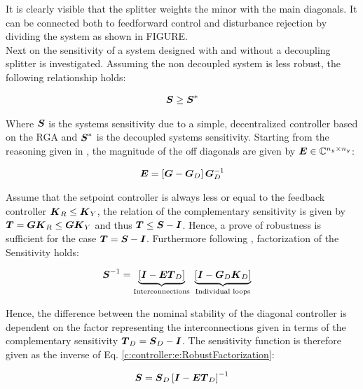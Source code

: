It is clearly visible that the splitter weights the minor with the main diagonals. It can be connected both to feedforward control and disturbance rejection by dividing the system as shown in FIGURE.\\

Next on the sensitivity of a system designed with and without a decoupling splitter is investigated. Assuming the non decoupled system is less robust, the following relationship holds:

\begin{align}
\mbox{\boldmath$S$} \geq \mbox{\boldmath$S$}^*
\end{align}

Where $\mbox{\boldmath$S$}$ is the systems sensitivity due to a simple, decentralized controller based on the RGA and $\mbox{\boldmath$S$}^*$ is the decoupled systems sensitivity. Starting from the reasoning given in \cite[p.443 ff.]{Skogestad2005}, the magnitude of the off diagonals are given by $\mbox{\boldmath$E$} \in \mathbb{C}^{n_y \times n_y}$:

\begin{align}
\mbox{\boldmath$E$} = \left[ \mbox{\boldmath$G$} - \mbox{\boldmath$G$}_D \right]\mbox{\boldmath$G$}_D^{-1}
\label{c:controller:e:InteractionMagnitude}
\end{align}

Assume that the setpoint controller is always less or equal to the feedback controller $\mbox{\boldmath$K$}_R \leq \mbox{\boldmath$K$}_Y$, the relation of the complementary sensitivity is given by $\mbox{\boldmath$T$} = \mbox{\boldmath$G$} \mbox{\boldmath$K$}_R \leq \mbox{\boldmath$G$} \mbox{\boldmath$K$}_Y$ and thus $\mbox{\boldmath$T$} \leq \mbox{\boldmath$S$} - \mbox{\boldmath$I$} $. Hence, a prove of robustness is sufficient for the case $\mbox{\boldmath$T$} = \mbox{\boldmath$S$} - \mbox{\boldmath$I$}$. Furthermore following \cite[p.443]{Skogestad2005}, factorization of the Sensitivity holds:

\begin{align}
\begin{split}
\mbox{\boldmath$S$}^{-1} &=\underbrace{\left[\mbox{\boldmath$I$} - \mbox{\boldmath$E$} \mbox{\boldmath$T$}_D \right]}_{\text{Interconnections}} ~ \underbrace{\left[ \mbox{\boldmath$I$} - \mbox{\boldmath$G$}_D \mbox{\boldmath$K$}_D \right]}_{\text{Individual loops}} 
\end{split}
\label{c:controller:e:RobustFactorization}
\end{align}

Hence, the difference between the nominal stability of the diagonal controller is dependent on the factor representing the interconnections given in terms of the complementary sensitivity $\mbox{\boldmath$T$}_D = \mbox{\boldmath$S$}_D - \mbox{\boldmath$I$} $. The sensitivity function is therefore given as the inverse of Eq. \ref{c:controller:e:RobustFactorization}:

\begin{align}
\mbox{\boldmath$S$} = \mbox{\boldmath$S$}_D \left[\mbox{\boldmath$I$} - \mbox{\boldmath$E$} \mbox{\boldmath$T$}_D \right]^{-1}
\label{c:controller:e:SensitivityClosedLoop}
\end{align}

